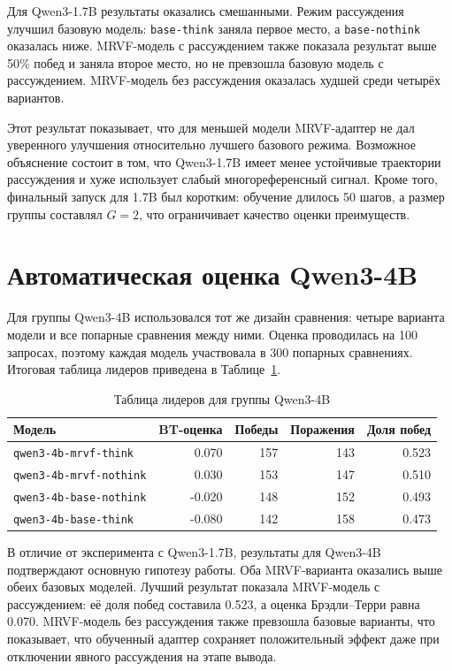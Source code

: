 Для Qwen3-1.7B результаты оказались смешанными. Режим рассуждения улучшил базовую модель: \texttt{base-think} заняла первое место, а \texttt{base-nothink} оказалась ниже. MRVF-модель с рассуждением также показала результат выше 50\% побед и заняла второе место, но не превзошла базовую модель с рассуждением. MRVF-модель без рассуждения оказалась худшей среди четырёх вариантов.

Этот результат показывает, что для меньшей модели MRVF-адаптер не дал уверенного улучшения относительно лучшего базового режима. Возможное объяснение состоит в том, что Qwen3-1.7B имеет менее устойчивые траектории рассуждения и хуже использует слабый многореференсный сигнал. Кроме того, финальный запуск для 1.7B был коротким: обучение длилось 50 шагов, а размер группы составлял \(G=2\), что ограничивает качество оценки преимуществ.

\section{Автоматическая оценка Qwen3-4B}

Для группы Qwen3-4B использовался тот же дизайн сравнения: четыре варианта модели и все попарные сравнения между ними. Оценка проводилась на 100 запросах, поэтому каждая модель участвовала в 300 попарных сравнениях. Итоговая таблица лидеров приведена в Таблице~\ref{tab:leaderboard-4b}.

\begin{table}[h]
  \centering
  \caption{Таблица лидеров для группы Qwen3-4B}
  \label{tab:leaderboard-4b}
  \begin{tabular}{p{7.2cm}rrrr}
    \hline
    Модель                         & BT-оценка & Победы & Поражения & Доля побед \\
    \hline
    \texttt{qwen3-4b-mrvf-think}   & 0.070     & 157    & 143       & 0.523      \\
    \texttt{qwen3-4b-mrvf-nothink} & 0.030     & 153    & 147       & 0.510      \\
    \texttt{qwen3-4b-base-nothink} & -0.020    & 148    & 152       & 0.493      \\
    \texttt{qwen3-4b-base-think}   & -0.080    & 142    & 158       & 0.473      \\
    \hline
  \end{tabular}
\end{table}

В отличие от эксперимента с Qwen3-1.7B, результаты для Qwen3-4B подтверждают основную гипотезу работы. Оба MRVF-варианта оказались выше обеих базовых моделей. Лучший результат показала MRVF-модель с рассуждением: её доля побед составила 0.523, а оценка Брэдли--Терри равна 0.070. MRVF-модель без рассуждения также превзошла базовые варианты, что показывает, что обученный адаптер сохраняет положительный эффект даже при отключении явного рассуждения на этапе вывода.

